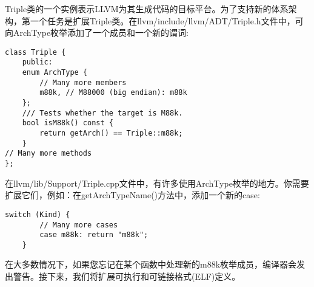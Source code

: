 Triple类的一个实例表示LLVM为其生成代码的目标平台。为了支持新的体系架构，第一个任务是扩展Triple类。在llvm/include/llvm/ADT/Triple.h文件中，可向ArchType枚举添加了一个成员和一个新的谓词:\par

\begin{lstlisting}[caption={}]
class Triple {
	public:
	enum ArchType {
		// Many more members
		m88k, // M88000 (big endian): m88k
	};
	/// Tests whether the target is M88k.
	bool isM88k() const {
		return getArch() == Triple::m88k;
	}
// Many more methods
};
\end{lstlisting}

在llvm/lib/Support/Triple.cpp文件中，有许多使用ArchType枚举的地方。你需要扩展它们，例如：在getArchTypeName()方法中，添加一个新的case:\par

\begin{lstlisting}[caption={}]
	switch (Kind) {
		// Many more cases
		case m88k: return "m88k";
	}
\end{lstlisting}

在大多数情况下，如果您忘记在某个函数中处理新的m88k枚举成员，编译器会发出警告。接下来，我们将扩展可执行和可链接格式(ELF)定义。\par




































